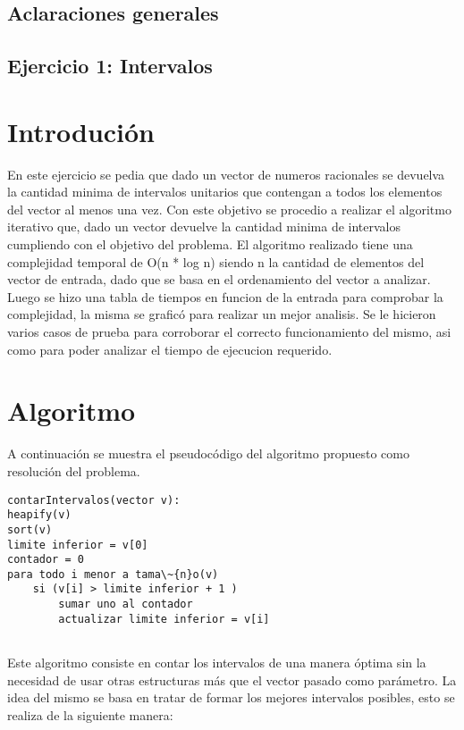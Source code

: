 \documentclass[a4paper, 12pt] {article}
\begin{document}
\begin{center}
\section*{Aclaraciones generales} 
\end{center}

\newpage

\begin{center}
\section*{Ejercicio 1: Intervalos}
\end{center}

\section*{Introduci\'on}
En este ejercicio se pedia que dado un vector de numeros racionales se devuelva la cantidad minima de intervalos unitarios que contengan a todos los elementos del vector al menos una vez.
Con este objetivo se procedio a realizar el algoritmo iterativo que, dado un vector devuelve la cantidad minima de intervalos cumpliendo con el objetivo del problema.
El algoritmo realizado tiene una complejidad temporal de O(n * log n) siendo n la cantidad de elementos del vector de entrada, dado que se basa en el ordenamiento del vector a analizar. Luego se hizo una tabla de tiempos en funcion de la entrada para comprobar la complejidad, la misma se grafic\'o para realizar un mejor analisis. Se le hicieron varios casos de prueba para corroborar el correcto funcionamiento del mismo, asi como para poder analizar el tiempo de ejecucion requerido.
\section*{Algoritmo}
A continuaci\'on se muestra el pseudoc\'odigo del algoritmo propuesto como resoluci\'on del problema.
\begin{verbatim}
contarIntervalos(vector v):
heapify(v)
sort(v) 
limite inferior = v[0]
contador = 0
para todo i menor a tama\~{n}o(v)
    si (v[i] > limite inferior + 1 ) 
        sumar uno al contador
        actualizar limite inferior = v[i]
  
\end{verbatim}

Este algoritmo consiste en contar los intervalos de una manera \'optima sin la necesidad de usar otras estructuras m\'as que el vector pasado como par\'ametro. La idea del mismo se basa en tratar de formar los mejores intervalos posibles, esto se realiza de la siguiente manera:
\end{document}
